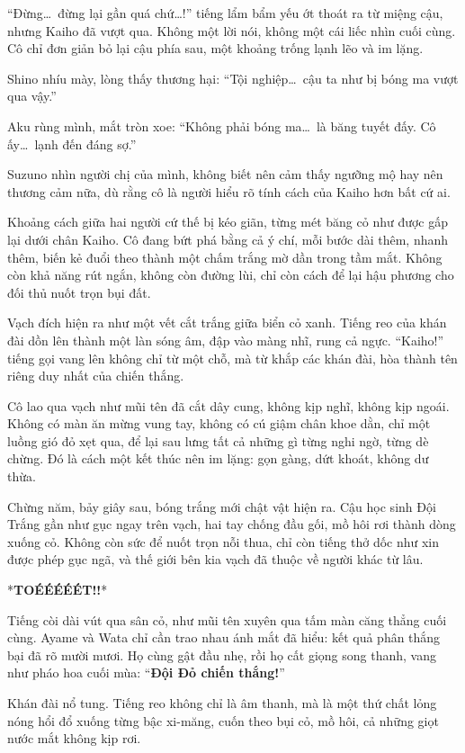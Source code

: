 \documentclass[../main.tex]{subfiles}
\begin{document}
``Đừng\dots\ đừng lại gần quá chứ\dots!'' tiếng lẩm bẩm yếu ớt thoát ra từ miệng cậu, nhưng Kaiho đã vượt qua. Không một lời nói, không một cái liếc nhìn cuối cùng. Cô chỉ đơn giản bỏ lại cậu phía sau, một khoảng trống lạnh lẽo và im lặng.

Shino nhíu mày, lòng thấy thương hại: ``Tội nghiệp\dots\ cậu ta như bị bóng ma vượt qua vậy.''

Aku rùng mình, mắt tròn xoe: ``Không phải bóng ma\dots\ là băng tuyết đấy. Cô ấy\dots\ lạnh đến đáng sợ.''

Suzuno nhìn người chị của mình, không biết nên cảm thấy ngưỡng mộ hay nên thương cảm nữa, dù rằng cô là người hiểu rõ tính cách của Kaiho hơn bất cứ ai.

Khoảng cách giữa hai người cứ thế bị kéo giãn, từng mét băng cỏ như được gấp lại dưới chân Kaiho. Cô đang bứt phá bằng cả ý chí, mỗi bước dài thêm, nhanh thêm, biến kẻ đuổi theo thành một chấm trắng mờ dần trong tầm mắt. Không còn khả năng rút ngắn, không còn đường lùi, chỉ còn cách để lại hậu phương cho đối thủ nuốt trọn bụi đất.

Vạch đích hiện ra như một vết cắt trắng giữa biển cỏ xanh. Tiếng reo của khán đài dồn lên thành một làn sóng âm, đập vào màng nhĩ, rung cả ngực. ``Kaiho!'' tiếng gọi vang lên không chỉ từ một chỗ, mà từ khắp các khán đài, hòa thành tên riêng duy nhất của chiến thắng.

Cô lao qua vạch như mũi tên đã cắt dây cung, không kịp nghĩ, không kịp ngoái. Không có màn ăn mừng vung tay, không có cú giậm chân khoe dằn, chỉ một luồng gió đỏ xẹt qua, để lại sau lưng tất cả những gì từng nghi ngờ, từng dè chừng. Đó là cách một kết thúc nên im lặng: gọn gàng, dứt khoát, không dư thừa.

Chừng năm, bảy giây sau, bóng trắng mới chật vật hiện ra. Cậu học sinh Đội Trắng gần như gục ngay trên vạch, hai tay chống đầu gối, mồ hôi rơi thành dòng xuống cỏ. Không còn sức để nuốt trọn nỗi thua, chỉ còn tiếng thở dốc như xin được phép gục ngã, và thế giới bên kia vạch đã thuộc về người khác từ lâu.

*\textbf{TOÉÉÉÉÉT!!}*

Tiếng còi dài vút qua sân cỏ, như mũi tên xuyên qua tấm màn căng thẳng cuối cùng.  Ayame và Wata chỉ cần trao nhau ánh mắt đã hiểu: kết quả phân thắng bại đã rõ mười mươi. Họ cùng gật đầu nhẹ, rồi họ cất giọng song thanh, vang như pháo hoa cuối mùa: ``\textbf{Đội Đỏ chiến thắng!}''

Khán đài nổ tung. Tiếng reo không chỉ là âm thanh, mà là một thứ chất lỏng nóng hổi đổ xuống từng bậc xi-măng, cuốn theo bụi cỏ, mồ hôi, cả những giọt nước mắt không kịp rơi.
\end{document}
